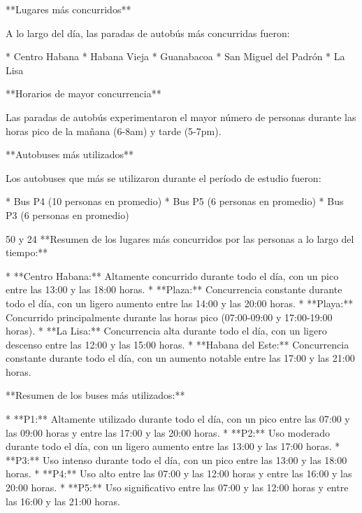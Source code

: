 \documentclass{article}
\begin{document}
**Lugares más concurridos**

A lo largo del día, las paradas de autobús más concurridas fueron:

* Centro Habana
* Habana Vieja
* Guanabacoa
* San Miguel del Padrón
* La Lisa

**Horarios de mayor concurrencia**

Las paradas de autobús experimentaron el mayor número de personas durante las horas pico de la mañana (6-8am) y tarde (5-7pm).

**Autobuses más utilizados**

Los autobuses que más se utilizaron durante el período de estudio fueron:

* Bus P4 (10 personas en promedio)
* Bus P5 (6 personas en promedio)
* Bus P3 (6 personas en promedio)

50 y 24
**Resumen de los lugares más concurridos por las personas a lo largo del tiempo:**

* **Centro Habana:** Altamente concurrido durante todo el día, con un pico entre las 13:00 y las 18:00 horas.
* **Plaza:** Concurrencia constante durante todo el día, con un ligero aumento entre las 14:00 y las 20:00 horas.
* **Playa:** Concurrido principalmente durante las horas pico (07:00-09:00 y 17:00-19:00 horas).
* **La Lisa:** Concurrencia alta durante todo el día, con un ligero descenso entre las 12:00 y las 15:00 horas.
* **Habana del Este:** Concurrencia constante durante todo el día, con un aumento notable entre las 17:00 y las 21:00 horas.

**Resumen de los buses más utilizados:**

* **P1:** Altamente utilizado durante todo el día, con un pico entre las 07:00 y las 09:00 horas y entre las 17:00 y las 20:00 horas.
* **P2:** Uso moderado durante todo el día, con un ligero aumento entre las 13:00 y las 17:00 horas.
* **P3:** Uso intenso durante todo el día, con un pico entre las 13:00 y las 18:00 horas.
* **P4:** Uso alto entre las 07:00 y las 12:00 horas y entre las 16:00 y las 20:00 horas.
* **P5:** Uso significativo entre las 07:00 y las 12:00 horas y entre las 16:00 y las 21:00 horas.
\end{document}

